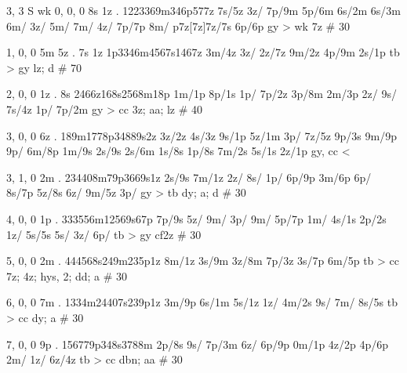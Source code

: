 3, 3
S
wk
0, 0, 0
8s 1z . 
1223369m346p577z
7s/5z 
3z/ 
7p/9m 
5p/6m 
6s/2m 
6s/3m 
6m/
3z/
5m/
7m/
4z/
7p/7p
8m/
p7z[7z]7z/7s
6p/6p
gy > wk 
7z # 30 

1, 0, 0
5m 5z . 7s 1z
1p3346m4567s1467z
3m/4z
3z/
2z/7z
9m/2z 
4p/9m 
2s/1p 
tb > gy 
lz; d # 70 

2, 0, 0
1z . 8s
2466z168s2568m18p
1m/1p 
8p/1s 
1p/ 
7p/2z 
3p/8m 
2m/3p 
2z/ 
9s/ 
7s/4z 
1p/ 
7p/2m
gy > cc 
3z; aa; lz # 40

3, 0, 0
6z . 
189m1778p34889s2z
3z/2z 
4s/3z
9s/1p 
5z/1m 
3p/ 
7z/5z
9p/3s 
9m/9p 
9p/ 
6m/8p
1m/9s 
2s/9s 
2s/6m 
1s/8s
1p/8s
7m/2s 
5s/1s 
2z/1p
gy, cc <

3, 1, 0
2m . 
234408m79p3669s1z
2s/9s 
7m/1z 
2z/
8s/
1p/
6p/9p 
3m/6p 
6p/
8s/7p 
5z/8s
6z/
9m/5z
3p/
gy > tb 
dy; a; d # 30

4, 0, 0
1p . 
333556m12569s67p
7p/9s 
5z/
9m/
3p/
9m/
5p/7p
1m/
4s/1s 
2p/2s 
1z/
5s/5s
5s/
3z/
6p/
tb > gy 
cf2z # 30 

5, 0, 0 
2m . 
444568s249m235p1z
8m/1z 
3s/9m 
3z/8m
7p/3z 
3s/7p
6m/5p
tb > cc 
7z; 4z; hys, 2; dd; a # 30

6, 0, 0
7m . 
1334m24407s239p1z
3m/9p
6s/1m 
5s/1z 
1z/
4m/2s 
9s/
7m/
8s/5s
tb > cc 
dy; a # 30

7, 0, 0
9p . 
156779p348s3788m
2p/8s
9s/
7p/3m 
6z/
6p/9p
0m/1p 
4z/2p 
4p/6p 
2m/
1z/
6z/4z
tb > cc 
dbn; aa # 30
